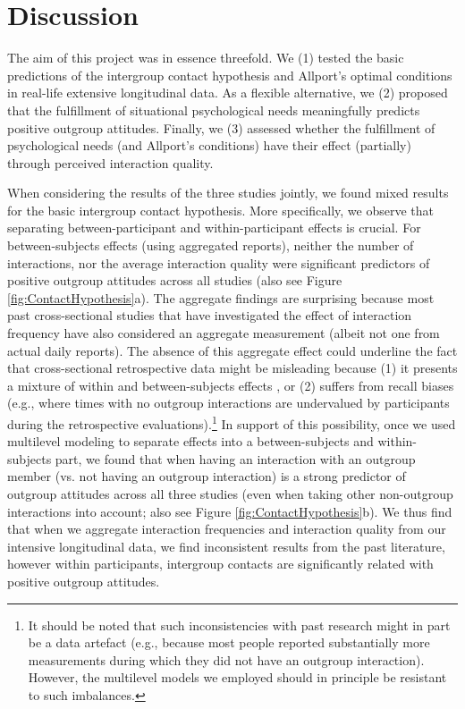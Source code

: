 \documentclass[man, 12pt, a4paper, mask]{apa7}
\theoremstyle{break}
\theoremstyle{plain}
\begin{document}
\section{Discussion}
The aim of this project was in essence threefold. We (1) tested the basic predictions of the intergroup contact hypothesis and Allport's optimal conditions in real-life extensive longitudinal data. As a flexible alternative, we (2) proposed that the fulfillment of situational psychological needs meaningfully predicts positive outgroup attitudes. Finally, we (3) assessed whether the fulfillment of psychological needs (and Allport's conditions) have their effect (partially) through perceived interaction quality. 

When considering the results of the three studies jointly, we found mixed results for the basic intergroup contact hypothesis. More specifically, we observe that separating between-participant and within-participant effects is crucial. For between-subjects effects (using aggregated reports), neither the number of interactions, nor the average interaction quality were significant predictors of positive outgroup attitudes across all studies (also see Figure \ref{fig:ContactHypothesis}a). The aggregate findings are surprising because most past cross-sectional studies that have investigated the effect of interaction frequency have also considered an aggregate measurement (albeit not one from actual daily reports). The absence of this aggregate effect could underline the fact that cross-sectional retrospective data might be misleading because (1) it presents a mixture of within and between-subjects effects \citep[][]{Hamaker2020}, or (2) suffers from recall biases (e.g., where times with no outgroup interactions are undervalued by participants during the retrospective evaluations).\footnote{It should be noted that such inconsistencies with past research might in part be a data artefact (e.g., because most people reported substantially more measurements during which they did not have an outgroup interaction). However, the multilevel models we employed should in principle be resistant to such imbalances.} In support of this possibility, once we used multilevel modeling to separate effects into a between-subjects and within-subjects part, we found that when having an interaction with an outgroup member (vs. not having an outgroup interaction) is a strong predictor of outgroup attitudes across all three studies (even when taking other non-outgroup interactions into account; also see Figure \ref{fig:ContactHypothesis}b). We thus find that when we aggregate interaction frequencies and interaction quality from our intensive longitudinal data, we find inconsistent results from the past literature, however within participants, intergroup contacts are significantly related with positive outgroup attitudes.
\end{document}

